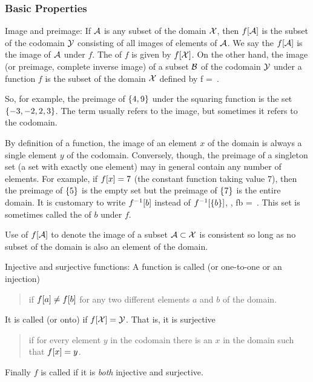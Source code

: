 \subsubsection{Basic Properties}
Image and preimage: If $\mathcal{A}$ is any subset of the domain $\mathcal{X}$, then $f\!\left[{\mathcal{A}}\right]$ is the subset of the codomain $\mathcal{Y}$ consisting of all images of elements of $\mathcal{A}$. We say the $f\!\left[{\mathcal{A}}\right]$ is the image of $\mathcal{A}$ under $f$. The  of $f$ is given by $f\!\left[{\mathcal{X}}\right]$. On the other hand, the  image (or preimage, complete inverse image) of a subset $\mathcal{B}$ of the codomain $\mathcal{Y}$ under a function $f$ is the subset of the domain $\mathcal{X}$ defined by
\beq
\inv f = \,.
\eeq

So, for example, the preimage of $\left\lbrace{4,9}\right\rbrace$ under the squaring function is the set $\left\lbrace{-3,-2,2,3}\right\rbrace$. The term  usually refers to the image, but sometimes it refers to the codomain.

By definition of a function, the image of an element $x$ of the domain is always a single element $y$ of the codomain. Conversely, though, the preimage of a singleton set (a set with exactly one element) may in general contain any number of elements. For example, if $f\!\left[{x}\right] = 7$ (the constant function taking value 7), then the preimage of $\left\lbrace{5}\right\rbrace$ is the empty set but the preimage of $\left\lbrace{7}\right\rbrace$ is the entire domain. It is customary to write ${f}^{-1}\!\left[{b}\right]$ instead of ${f}^{-1}\!\left[{\left\lbrace{b}\right\rbrace}\right]$, \ie,
\beq
\inv f\vat b = \,.
\eeq
This set is sometimes called the  of $b$ under $f$.

Use of $f\!\left[{\mathcal{A}}\right]$ to denote the image of a subset $\mathcal{A}\subset\mathcal{X}$ is consistent so long as no subset of the domain is also an element of the domain.

Injective and surjective functions: A function is called  (or one-to-one or an injection) 
\begin{quote}
if $f\!\left[{a}\right]\neq f\!\left[{b}\right]$ for any two different elements $a$ and $b$ of the domain. 
\end{quote}
It is called  (or onto) if $f\!\left[{\mathcal{X}}\right] = \mathcal{Y}$. That is, it is surjective 
\begin{quote}
if for every element $y$ in the codomain there is an $x$ in the domain such that $f\!\left[{x}\right] = y$. 
\end{quote}
Finally $f$ is called  if it is \emph{both} injective and surjective.

